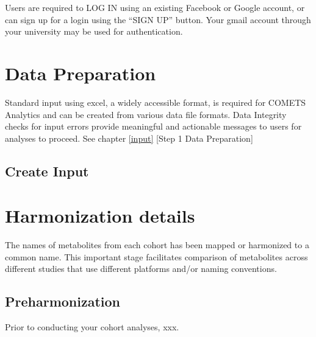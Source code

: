 \documentclass[]{book}
\begin{document}
{Users are required to LOG IN using an existing Facebook or Google
account, or can sign up for a login using the ``SIGN UP'' button. Your
gmail account through your university may be used for authentication. }


\section{Data Preparation}\label{data-preparation}

Standard input using excel, a widely accessible format, is required for
COMETS Analytics and can be created from various data file formats. Data
Integrity checks for input errors provide meaningful and actionable
messages to users for analyses to proceed. See chapter \ref{input}
{[}Step 1 Data Preparation{]}

\subsection{Create Input}\label{create-input}

\section{Harmonization details}\label{details-harmonize}

The names of metabolites from each cohort has been mapped or harmonized
to a common name. This important stage facilitates comparison of
metabolites across different studies that use different platforms and/or
naming conventions.

\subsection{Preharmonization}\label{preharmonization}

Prior to conducting your cohort analyses, xxx.
\end{document}
